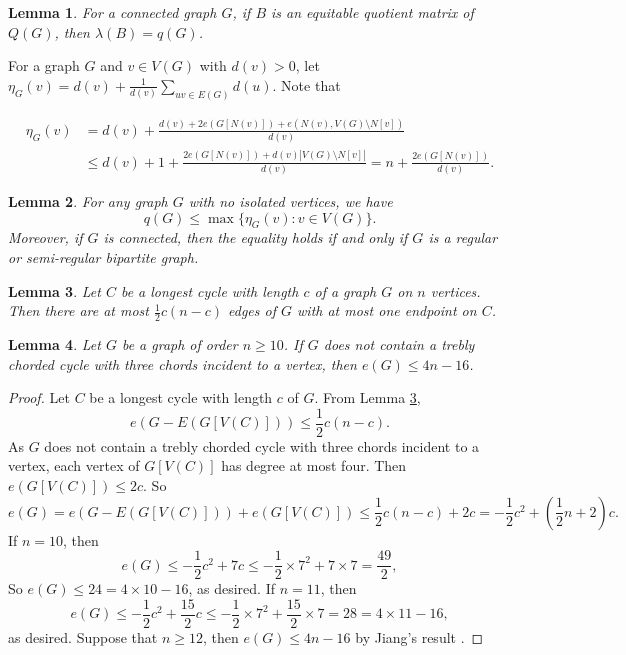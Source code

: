 \documentclass[12pt]{article}
\newtheorem {lemma}{Lemma}[section]
\begin{document}
\begin{lemma}\label{quo}
For a connected graph $G$, if $B$ is an equitable quotient matrix of $Q(G)$, then $\lambda(B)=q(G)$.
\end{lemma}

For a graph $G$ and $v\in V(G)$ with $d(v)>0$, let $\eta_G(v)=d(v)+\frac{1}{d(v)}\sum_{uv\in E(G)}d(u)$.
Note that


\begin{align}
\eta_{G}(v)&=d(v)+\frac{d(v)+2e(G[N(v)])+e(N(v),V(G)\setminus N[v])}{d(v)}\label{q11}\\
&\le  d(v)+1+\frac{2e(G[N(v)])+d(v)|V(G)\setminus N[v]|}{d(v)}=n+\frac{2e(G[N(v)])}{d(v)}.\label{q12}
\end{align}



\begin{lemma}\label{q1}\cite{FY}
For any graph $G$ with no isolated vertices, we have
\[
q(G)\le \max \{\eta_G(v): v\in V(G)\}.
\]
Moreover, if $G$ is connected, then the equality holds if and only if $G$ is a regular or semi-regular bipartite graph.
\end{lemma}

\begin{lemma}\label{e1}\cite{JAB}
Let $C$ be a longest cycle with length $c$ of a graph $G$ on $n$ vertices. Then there are at most $\frac{1}{2}c\left(n-c\right)$ edges of $G$ with at most one endpoint on $C$.
\end{lemma}

\begin{lemma}\label{ee}
Let $G$ be a graph of order $n\ge 10$. If $G$ does not contain a trebly chorded cycle with three chords incident to a vertex, then $e(G)\le 4n-16$.
\end{lemma}
\begin{proof}
Let $C$ be a longest cycle with length $c$ of $G$. From Lemma \ref{e1},
\[
e(G-E(G[V(C)]))\le \frac{1}{2}c\left(n-c\right).
\]
As $G$ does not contain a trebly chorded cycle with three chords incident to a vertex, each vertex of $G[V(C)]$ has degree at most four.  Then $e(G[V(C)])\le 2c$. So
\[
e(G)= e(G-E(G[V(C)]))+e(G[V(C)])\le \frac{1}{2}c\left(n-c\right)+2c=-\frac{1}{2}c^2+\left(\frac{1}{2}n+2\right)c.
\]
If $n=10$, then
\[
e(G)\le -\frac{1}{2}c^2+7c\le -\frac{1}{2}\times 7^2+7\times 7=\frac{49}{2},
\]
So $e(G)\le 24=4\times 10-16$, as desired.
If $n=11$, then
\[
e(G)\le -\frac{1}{2}c^2+\frac{15}{2}c\le -\frac{1}{2}\times 7^2+\frac{15}{2}\times 7=28=4\times 11-16,
\]
as desired.
Suppose that $n\ge 12$, then $e(G)\le 4n-16$ by Jiang's result  \cite{Ji}.
\end{proof}
\end{document}

